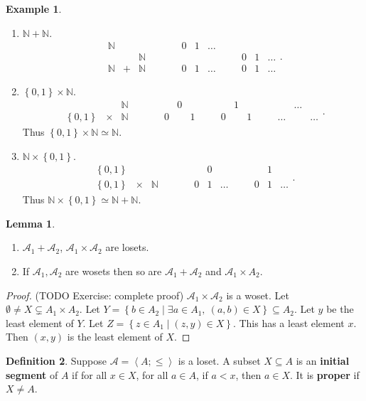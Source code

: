 \documentclass{article}
\newcommand{\N}{\mathbb{N}}
\newcommand{\A}{\mathcal{A}}
\newcommand{\rb}[1]{\left( #1 \right)}
\newcommand{\cb}[1]{\left\{ #1 \right\}}
\newcommand{\ab}[1]{\left\langle #1 \right\rangle}
\theoremstyle{definition}\newtheorem{definition}{Definition}[subsection]
\theoremstyle{definition}\newtheorem{remark}[definition]{Remark}
\theoremstyle{definition}\newtheorem*{example}{Example}
\theoremstyle{definition}\newtheorem*{note}{Note}
\newtheorem{lemma}[definition]{Lemma}
\begin{document}
\begin{example}
\hfill
\begin{enumerate}
\item $ \N + \N $.
$$
\begin{array}{ccccccccccc}
\N & & & \qquad & 0 & 1 & \dots & \quad & & & \\
& & \N & \qquad & & & & \quad & 0 & 1 & \dots \\
\N & + & \N & \qquad & 0 & 1 & \dots & \quad & 0 & 1 & \dots
\end{array}.
$$
\item $ \cb{0, 1} \times \N $.
$$
\begin{array}{ccccccccccccccc}
& & \N & \qquad & & 0 & & \quad & & 1 & & \quad & & \dots & \\
\cb{0, 1} & \times & \N & \qquad & 0 & & 1 & \quad & 0 & & 1 & \quad & \dots & & \dots
\end{array}.
$$
Thus $ \cb{0, 1} \times \N \simeq \N $.
\item $ \N \times \cb{0, 1} $.
$$
\begin{array}{ccccccccccc}
\cb{0, 1} & & & \qquad & & 0 & & & & 1 & \\
\cb{0, 1} & \times & \N & \qquad & 0 & 1 & \dots & \quad & 0 & 1 & \dots
\end{array}.
$$
Thus $ \N \times \cb{0, 1} \simeq \N + \N $.
\end{enumerate}
\end{example}

\begin{lemma}
\hfill
\begin{enumerate}
\item $ \A_1 + \A_2 $, $ \A_1 \times \A_2 $ are losets.
\item If $ \A_1, \A_2 $ are wosets then so are $ \A_1 + \A_2 $ and $ \A_1 \times A_2 $.
\end{enumerate}
\end{lemma}

\begin{proof}
(TODO Exercise: complete proof) $ \A_1 \times \A_2 $ is a woset. Let $ \emptyset \ne X \subsetneq A_1 \times A_2 $. Let $ Y = \cb{b \in A_2 \mid \exists a \in A_1, \ \rb{a, b} \in X} \subseteq A_2 $. Let $ y $ be the least element of $ Y $. Let $ Z = \cb{z \in A_1 \mid \rb{z, y} \in X} $. This has a least element $ x $. Then $ \rb{x, y} $ is the least element of $ X $.
\end{proof}

\begin{definition}
Suppose $ \A = \ab{A; \le} $ is a loset. A subset $ X \subseteq A $ is an \textbf{initial segment} of $ A $ if for all $ x \in X $, for all $ a \in A $, if $ a < x $, then $ a \in X $. It is \textbf{proper} if $ X \ne A $.
\end{definition}
\end{document}
